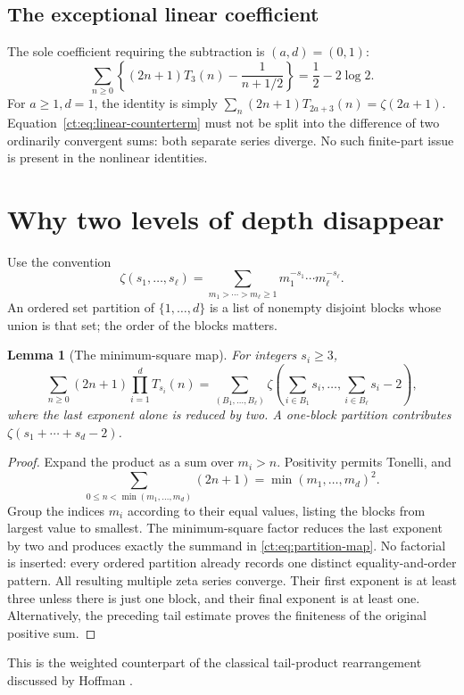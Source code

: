 \documentclass[11pt]{article}
\numberwithin{equation}{section}
\newtheorem{lemma}[theorem]{Lemma}
\theoremstyle{definition}\newtheorem{definition}[theorem]{Definition}
\theoremstyle{remark}\newtheorem{remark}[theorem]{Remark}
\begin{document}
\subsection{The exceptional linear coefficient}
The sole coefficient requiring the subtraction is $(a,d)=(0,1)$:
\begin{equation}\label{ct:eq:linear-counterterm}
 \sum_{n\ge0}\left\{(2n+1)T_3(n)-\frac1{n+1/2}\right\}
       =\frac12-2\log2.
\end{equation}
For $a\ge1,d=1$, the identity is simply
$\sum_n(2n+1)T_{2a+3}(n)=\zeta(2a+1)$.
Equation~\eqref{ct:eq:linear-counterterm} must not be split into the
difference of two ordinarily convergent sums: both separate series diverge.
No such finite-part issue is present in the nonlinear identities.

\section{Why two levels of depth disappear}
\label{ct:sec:descent}
Use the convention
\begin{equation}\label{ct:eq:mzv}
 \zeta(s_1,\ldots,s_\ell)
  =\sum_{m_1>\cdots>m_\ell\ge1}
          m_1^{-s_1}\cdots m_\ell^{-s_\ell}.
\end{equation}
An ordered set partition of $\{1,\ldots,d\}$ is a list of nonempty disjoint
blocks whose union is that set; the order of the blocks matters.

\begin{lemma}[The minimum-square map]\label{ct:lem:partitions}
For integers $s_i\ge3$,
\begin{equation}\label{ct:eq:partition-map}
 \sum_{n\ge0}(2n+1)\prod_{i=1}^dT_{s_i}(n)
  =\sum_{(B_1,\ldots,B_\ell)}
     \zeta\left(\sum_{i\in B_1}s_i,\ldots,
                  \sum_{i\in B_\ell}s_i-2\right),
\end{equation}
where the last exponent alone is reduced by two. A one-block partition
contributes $\zeta(s_1+\cdots+s_d-2)$.
\end{lemma}
\begin{proof}
Expand the product as a sum over $m_i>n$. Positivity permits Tonelli, and
\[
 \sum_{0\le n<\min(m_1,\ldots,m_d)}(2n+1)
       =\min(m_1,\ldots,m_d)^2.
\]
Group the indices $m_i$ according to their equal values, listing the blocks
from largest value to smallest. The minimum-square factor reduces the
last exponent by two and produces exactly the summand in
\eqref{ct:eq:partition-map}. No factorial is inserted: every ordered
partition already records one distinct equality-and-order pattern.
All resulting multiple zeta series converge. Their first exponent is at
least three unless there is just one block, and their final exponent is
at least one. Alternatively, the preceding tail estimate proves the
finiteness of the original positive sum.
\end{proof}
This is the weighted counterpart of the classical tail-product
rearrangement discussed by Hoffman \cite{ct:hoffman}.
\end{document}
